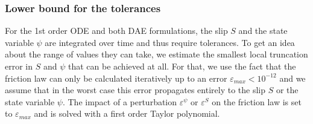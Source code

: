 \subsubsection{Lower bound for the tolerances}
\label{ssec:LowerBoundTimeTolerance}
For the 1st order ODE and both DAE formulations, the slip $S$ and the state variable $\psi$ are integrated over time and thus require tolerances. To get an idea about the range of values they can take, we estimate the smallest local truncation error in  $S$ and $\psi$ that can be achieved at all. For that, we use the fact that the friction law can only be calculated iteratively up to an error $\varepsilon_{max} < 10^{-12}$ and we assume that in the worst case this error propagates entirely to the slip $S$ or the state variable $\psi$. The impact of a perturbation $\varepsilon^{\psi}$ or $\varepsilon^{S}$ on the friction law is set to $\varepsilon_{max}$ and is solved with a first order Taylor polynomial.

